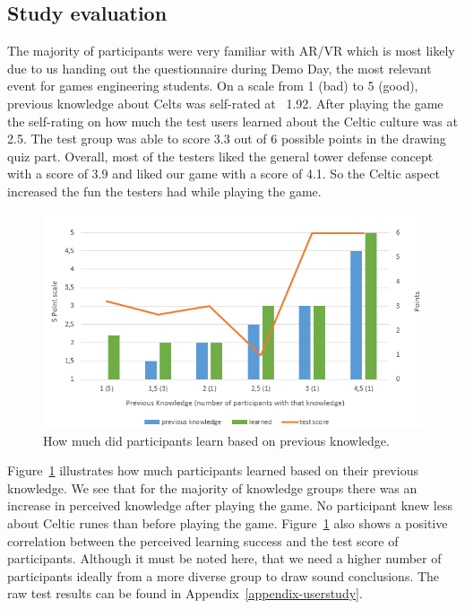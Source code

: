 \subsection{Study evaluation}

The majority of participants were very familiar with AR/VR which is most likely due to us handing out the questionnaire during Demo Day, the most relevant event for games engineering students.
On a scale from 1 (bad) to 5 (good), previous knowledge about Celts was self-rated at ~1.92. After playing the game the self-rating on how much the test users learned about the Celtic culture was at 2.5.
The test group was able to score 3.3 out of 6 possible points in the drawing quiz part.
Overall, most of the testers liked the general tower defense concept with a score of 3.9 and liked our game with a score of 4.1. So the Celtic aspect increased the fun the testers had while playing the game.

\begin{figure}[ht]
	\centering
	\includegraphics[width=0.95\linewidth]{figures/knowledge-learned.png}
	\caption{How much did participants learn based on previous knowledge.}
	\label{fig:knowledge-learned}
\end{figure}


Figure~\ref{fig:knowledge-learned} illustrates how much participants learned based on their previous knowledge. We see that for the majority of knowledge groups there was an increase in perceived knowledge after playing the game. No participant knew less about Celtic runes than before playing the game. Figure~\ref{fig:knowledge-learned} also shows a positive correlation between the perceived learning success and the test score of participants.
Although it must be noted here, that we need a higher number of participants ideally from a more diverse group to draw sound conclusions. The raw test results can be found in Appendix~\ref{appendix-userstudy}.

